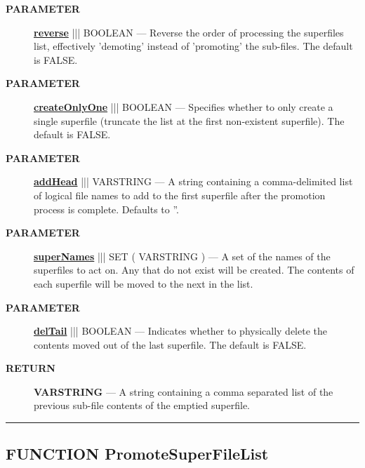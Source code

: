 \par
\begin{description}
\item [\colorbox{tagtype}{\color{white} \textbf{\textsf{PARAMETER}}}] \textbf{\underline{reverse}} ||| BOOLEAN --- Reverse the order of processing the superfiles list, effectively 'demoting' instead of 'promoting' the sub-files. The default is FALSE.
\item [\colorbox{tagtype}{\color{white} \textbf{\textsf{PARAMETER}}}] \textbf{\underline{createOnlyOne}} ||| BOOLEAN --- Specifies whether to only create a single superfile (truncate the list at the first non-existent superfile). The default is FALSE.
\item [\colorbox{tagtype}{\color{white} \textbf{\textsf{PARAMETER}}}] \textbf{\underline{addHead}} ||| VARSTRING --- A string containing a comma-delimited list of logical file names to add to the first superfile after the promotion process is complete. Defaults to ''.
\item [\colorbox{tagtype}{\color{white} \textbf{\textsf{PARAMETER}}}] \textbf{\underline{superNames}} ||| SET ( VARSTRING ) --- A set of the names of the superfiles to act on. Any that do not exist will be created. The contents of each superfile will be moved to the next in the list.
\item [\colorbox{tagtype}{\color{white} \textbf{\textsf{PARAMETER}}}] \textbf{\underline{delTail}} ||| BOOLEAN --- Indicates whether to physically delete the contents moved out of the last superfile. The default is FALSE.
\end{description}







\par
\begin{description}
\item [\colorbox{tagtype}{\color{white} \textbf{\textsf{RETURN}}}] \textbf{VARSTRING} --- A string containing a comma separated list of the previous sub-file contents of the emptied superfile.
\end{description}




\rule{\linewidth}{0.5pt}
\subsection*{\textsf{\colorbox{headtoc}{\color{white} FUNCTION}
PromoteSuperFileList}}

